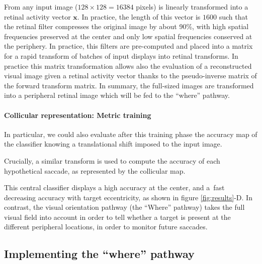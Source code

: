 From any input image ($128\times 128=16384$ pixels) is linearly transformed into a retinal activity vector $\boldsymbol{x}$. In practice, the length of this vector is $1600$ such that the retinal filter compresses the original image by about 90\%, with high spatial frequencies preserved at the center and only low spatial frequencies conserved at the periphery. In practice, this filters are pre-computed and placed into a matrix for a rapid transform of batches of input displays into retinal transforms. In practice this matrix transformation allows also the evaluation of a reconstructed visual image given a retinal activity vector thanks to the pseudo-inverse matrix of the forward transform matrix. In summary, the full-sized images are transformed into a peripheral retinal image which will be fed to the ``where'' pathway.

\paragraph{Collicular representation: Metric training}

 In particular, we could also evaluate after this training phase the accuracy map of the classifier knowing a translational shift imposed to the input image. 

 Crucially, a similar transform is used to compute the accuracy of each hypothetical saccade, as represented by the collicular map. %



 This central classifier displays a high accuracy at the center, and a fast decreasing accuracy with target eccentricity, as shown in figure \ref{fig:results}-D. In contrast, the visual orientation pathway (the ``Where'' pathway) takes the full visual field into account in order to tell whether a target is present at the different peripheral locations, in order to monitor future saccades.




\subsection{Implementing the ``where'' pathway}

